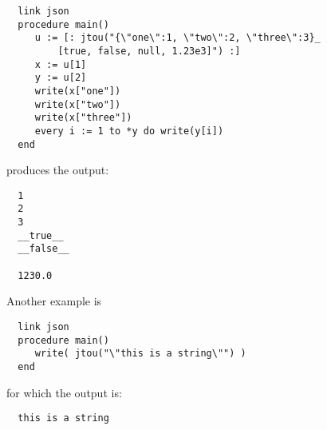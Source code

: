 \documentclass[letterpaper,12pt]{article}
\begin{document}
\begin{description}
  \begin{verbatim}
  link json
  procedure main()
     u := [: jtou("{\"one\":1, \"two\":2, \"three\":3}_
         [true, false, null, 1.23e3]") :]
     x := u[1]
     y := u[2]
     write(x["one"])
     write(x["two"])
     write(x["three"])
     every i := 1 to *y do write(y[i])
  end
  \end{verbatim}

produces the output:

  \begin{verbatim}
  1
  2
  3
  __true__
  __false__

  1230.0
  \end{verbatim}


Another example is 

  \begin{verbatim}
  link json
  procedure main()
     write( jtou("\"this is a string\"") )
  end
  \end{verbatim}

for which the output is:

  \begin{verbatim}
  this is a string
  \end{verbatim}

\end{description}
\end{document}
